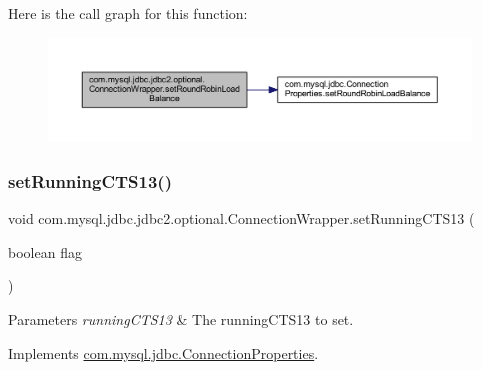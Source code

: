 Here is the call graph for this function\+:
\nopagebreak
\begin{figure}[H]
\begin{center}
\leavevmode
\includegraphics[width=350pt]{classcom_1_1mysql_1_1jdbc_1_1jdbc2_1_1optional_1_1_connection_wrapper_a443c2aa5fdc8084aa721378f69257562_cgraph}
\end{center}
\end{figure}
\mbox{\label{classcom_1_1mysql_1_1jdbc_1_1jdbc2_1_1optional_1_1_connection_wrapper_a7a84fadba26631fe6770c399ab0a5e8a}} 
\subsubsection{\texorpdfstring{set\+Running\+C\+T\+S13()}{setRunningCTS13()}}
{\footnotesize\ttfamily void com.\+mysql.\+jdbc.\+jdbc2.\+optional.\+Connection\+Wrapper.\+set\+Running\+C\+T\+S13 (\begin{DoxyParamCaption}\item[{boolean}]{flag }\end{DoxyParamCaption})}


\begin{DoxyParams}{Parameters}
{\em running\+C\+T\+S13} & The running\+C\+T\+S13 to set. \\
\hline
\end{DoxyParams}


Implements \mbox{\hyperlink{interfacecom_1_1mysql_1_1jdbc_1_1_connection_properties_abb37aa2ea5dd29021d40a76b33b82939}{com.\+mysql.\+jdbc.\+Connection\+Properties}}.

